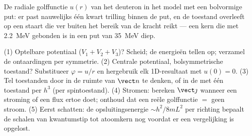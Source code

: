 \begin{omfigure}

{\small De radiale golffunctie $u(r)$ van het deuteron in het model met
een bolvormige put: er past nauwelijks één kwart trilling binnen de put,
en de toestand overleeft op een staart die ver buiten het bereik van de
kracht reikt --- een kern die met \qty{2.2}{MeV} gebonden is in een put
van \qty{35}{MeV} diep.}
\end{omfigure}

\begin{method}\label{met:b3:schrodinger-three-dimensions:method}
(1) Optelbare potentiaal ($V_1 + V_2 + V_3$)? Scheid; de energieën tellen
op; verzamel de ontaardingen per symmetrie. (2) Centrale potentiaal,
bolsymmetrische toestand? Substitueer $\varphi = u/r$ en hergebruik elk
1D-resultaat met $u(0) = 0$. (3) Tel toestanden door in de ruimte van
$\vect n$ te denken, of in de  met één toestand per $h^3$ (per
spintoestand). (4) Stromen: bereken $\vect\jmath$ wanneer een stroming of
een flux ertoe doet; onthoud dat een reële golffunctie $=$ geen stroom.
(5) Eerst schatten: de opsluitingsenergie $\sim h^2/8mL^2$ per richting
bepaalt de schalen van kwantumstip tot atoomkern nog voordat er een
vergelijking is opgelost.
\end{method}

